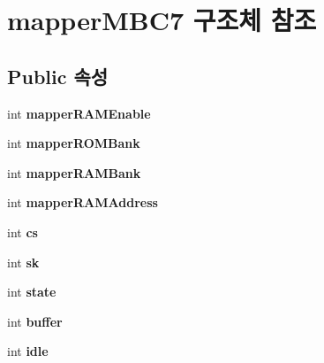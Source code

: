 \hypertarget{structmapper_m_b_c7}{}\section{mapper\+M\+B\+C7 구조체 참조}
\label{structmapper_m_b_c7}
\subsection*{Public 속성}
\begin{DoxyCompactItemize}
\item 
\mbox{\label{structmapper_m_b_c7_a308dbc9dd64faa04d2e95f61491c468e}} 
int {\bfseries mapper\+R\+A\+M\+Enable}
\item 
\mbox{\label{structmapper_m_b_c7_a4b98c0c2af73da2d2ed5b61309ad20f4}} 
int {\bfseries mapper\+R\+O\+M\+Bank}
\item 
\mbox{\label{structmapper_m_b_c7_a079931b2d99b6a11fa4634c51d220a4b}} 
int {\bfseries mapper\+R\+A\+M\+Bank}
\item 
\mbox{\label{structmapper_m_b_c7_a57b352ae322a433431c93993b978b5f8}} 
int {\bfseries mapper\+R\+A\+M\+Address}
\item 
\mbox{\label{structmapper_m_b_c7_ac60ec6543e31662a5fe47333b56e1153}} 
int {\bfseries cs}
\item 
\mbox{\label{structmapper_m_b_c7_a088e6d513db11995a4c0be5471e6eb1e}} 
int {\bfseries sk}
\item 
\mbox{\label{structmapper_m_b_c7_a10cd38456a7b38fd215213deca812b43}} 
int {\bfseries state}
\item 
\mbox{\label{structmapper_m_b_c7_a2a78696abc5026b581f7d9b560f9957e}} 
int {\bfseries buffer}
\item 
\mbox{\label{structmapper_m_b_c7_a7b67228ff9c824cc833cf6c4fe692526}} 
int {\bfseries idle}
\item 
\mbox{\label{structmapper_m_b_c7_aaad1e70e16b8915cdef583baca91402f}} 

\end{DoxyCompactItemize}
